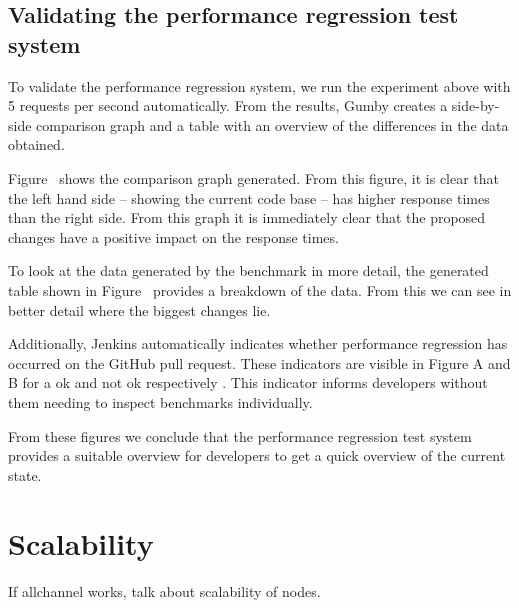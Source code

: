 
\subsection{Validating the performance regression test system}

To validate the performance regression system, we run the experiment above with 5 requests per second automatically.
From the results, Gumby creates a side-by-side comparison graph and a table with an overview of the differences in the data obtained.

Figure~  shows the comparison graph generated.
From this figure, it is clear that the left hand side -- showing the current code base -- has higher response times than the right side.
From this graph it is immediately clear that the proposed changes have a positive impact on the response times.

To look at the data generated by the benchmark in more detail, the generated table shown in Figure~  provides a breakdown of the data.
From this we can see in better detail where the biggest changes lie.

Additionally, Jenkins automatically indicates whether performance regression has occurred on the GitHub pull request.
These indicators are visible in Figure A and B for a ok and not ok respectively .
This indicator informs developers without them needing to inspect benchmarks individually.

From these figures we conclude that the performance regression test system provides a suitable overview for developers to get a quick overview of the current state.

\section{Scalability}

If allchannel works, talk about scalability of nodes. 